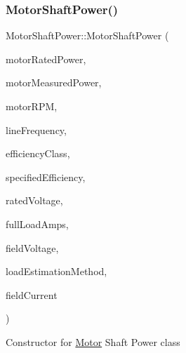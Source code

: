 \subsubsection{\texorpdfstring{Motor\+Shaft\+Power()}{MotorShaftPower()}\hspace{0.1cm}{\footnotesize\ttfamily [3/3]}}
{\footnotesize\ttfamily Motor\+Shaft\+Power\+::\+Motor\+Shaft\+Power (\begin{DoxyParamCaption}\item[{double}]{motor\+Rated\+Power,  }\item[{double}]{motor\+Measured\+Power,  }\item[{int}]{motor\+R\+PM,  }\item[{\hyperlink{class_motor_acee1bdf1b684ad36cb80dc2829d9fcee}{Motor\+::\+Line\+Frequency}}]{line\+Frequency,  }\item[{\hyperlink{class_motor_afa022971ae062406a9f588c601673d4e}{Motor\+::\+Efficiency\+Class}}]{efficiency\+Class,  }\item[{double}]{specified\+Efficiency,  }\item[{double}]{rated\+Voltage,  }\item[{double}]{full\+Load\+Amps,  }\item[{double}]{field\+Voltage,  }\item[{\hyperlink{class_field_data_a424e89914ba5684c01bb269dbe3312fd}{Field\+Data\+::\+Load\+Estimation\+Method}}]{load\+Estimation\+Method,  }\item[{double}]{field\+Current }\end{DoxyParamCaption})\hspace{0.3cm}{\ttfamily [inline]}}

Constructor for \hyperlink{class_motor}{Motor} Shaft Power class



